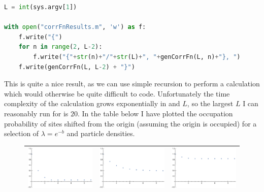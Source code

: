 \begin{lstlisting}[language=Python]
L = int(sys.argv[1])

with open("corrFnResults.m", 'w') as f:
    f.write("{")
    for n in range(2, L-2):
        f.write("{"+str(n)+"/"+str(L)+", "+genCorrFn(L, n)+"}, ")
    f.write(genCorrFn(L, L-2) + "}")
\end{lstlisting}

This is quite a nice result, as we can use simple recursion to perform a calculation which would otherwise be quite difficult to code.
Unfortunately the time complexity of the calculation grows exponentially in and $L$, so the largest $L$ I can reasonably run for is $20$. In the table below I have plotted the occupation probability of sites shifted from the origin
(assuming the origin is occupied)  for a selection of $\lambda = e^{-b}$ and particle densities.

\begin{figure}[h!]
\caption{\label{fig:corrFns} }
\begin{center}
 \begin{tabular}{c | c | c}
    \includegraphics[width=0.32\linewidth]{analytics/images/exactCorrFns/lowDensLowL}  & \includegraphics[width=0.32 \linewidth]{analytics/images/exactCorrFns/midDensLowL} & \includegraphics[width=0.32 \linewidth]{analytics/images/exactCorrFns/highDensLowL} \\
    \hline

\end{tabular}
\end{center}
\end{figure}
